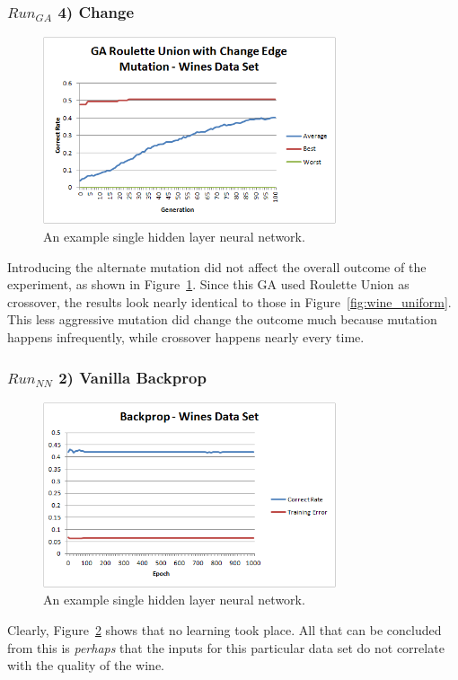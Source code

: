 \documentclass[journal]{IEEEtran}
\begin{document}
    \subsubsection*{$Run_{GA}$ 4) Change}
      \begin{figure}[here]%
        \centering
        \includegraphics[width=3.4in]{wine_change_edge}
        \caption{An example single hidden layer neural network.}
        \label{fig:wine_change_edge}
      \end{figure}
      Introducing the alternate mutation did not affect the overall outcome of the experiment, as
      shown in Figure~\ref{fig:wine_change_edge}. Since this GA  used Roulette Union as crossover, the
      results look nearly identical to those in Figure~\ref{fig:wine_uniform}. This less aggressive mutation
      did change the outcome much because mutation happens infrequently, while crossover happens nearly every time.

    \subsubsection*{$Run_{NN}$ 2) Vanilla Backprop}
      \begin{figure}[here]%
        \centering
        \includegraphics[width=3.4in]{brain_wine}
        \caption{An example single hidden layer neural network.}
        \label{fig:brain_wine}
      \end{figure}
    Clearly, Figure~\ref{fig:brain_wine} shows that no learning took place. All that can be concluded from this
    is \textit{perhaps} that the inputs for this particular data set do not correlate with the quality of the wine.
\end{document}
